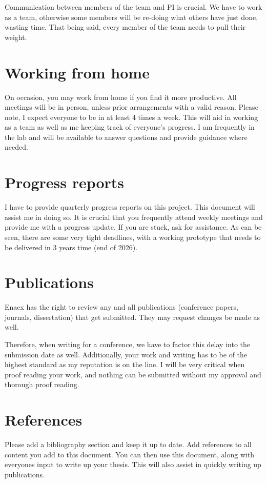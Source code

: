 	Communication between members of the team and PI is crucial. We have to work as a team, otherwise some members will be re-doing what others have just done, wasting time. That being said, every member of the team needs to pull their weight. 
	
\section{Working from home}
	On occasion, you may work from home if you find it more productive. All meetings will be in person, unless prior arrangements with a valid reason. Please note, I expect everyone to be in at least 4 times a week. This will aid in working as a team as well as me keeping track of everyone's progress. I am frequently in the lab and will be available to answer questions and provide guidance where needed. 

\section{Progress reports}
	I have to provide quarterly progress reports on this project. This document will assist me in doing so. It is crucial that you frequently attend weekly meetings and provide me with a progress update. If you are stuck, ask for assistance. As can be seen, there are some very tight deadlines, with a working prototype that needs to be delivered in 3 years time (end of 2026).  
	
\section{Publications}
	Enaex has the right to review any and all publications (conference papers, journals, dissertation) that get submitted. They may request changes be made as well. 
	
	Therefore, when writing for a conference, we have to factor this delay into the submission date as well. Additionally, your work and writing has to be of the highest standard as my reputation is on the line. I will be very critical when proof reading your work, and nothing can be submitted without my approval and thorough proof reading. 
	
\section{References}
	Please add a bibliography section and keep it up to date. Add references to all content you add to this document. You can then use this document, along with everyones input to write up your thesis. This will also assist in quickly writing up publications. 